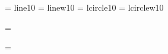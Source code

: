 \font\tenln    = line10
\font\tenlnw   = linew10  
\font\tencirc  = lcircle10 %
\font\tencircw = lcirclew10 %

%
\ifnum{}\tenln=\tencirc \else 
  \immediate{}\fi
\ifnum{}\tenlnw=\tencircw \else 
  \immediate{}\fi


\def\cmfont@{\def\rm{\protect\prm}\def\sl{\protect\psl}%
\def\bf{\protect\pbf\protect\pgt}}\cmfont@
\def\cmfont{\cmfont@\rm}%
\def\mcfont{\def\rm{\protect\pbk}\def\sl{\protect\psbk}%
\def\bf{\protect\pbbk\protect\pgt}\rm}%
\def\it{\protect\pit}
\def\sf{\protect\psf}
\def\sc{\protect\psc}
\def\tt{\protect\ptt}
\def\mc{\protect\pmin}
\def\gt{\protect\pgt}
\def\bk{\protect\pbk}
\def\mbk{\protect\pmbk}
\def\bbk{\protect\pbbk}
\def\ebk{\protect\pebk}
\def\sbk{\protect\psbk}
\def\smbk{\protect\psmbk}
\def\sbbk{\protect\psbbk}
\def\sebk{\protect\psebk}
\def\elite{\protect\pel}
\def\belite{\protect\pbel}
\def\pica{\protect\ppi}
\def\bpica{\protect\pbpi}

\def\@mbi{cmmib10}
\def\@mbsy{cmbsy10}
\def\@mcsc{cmcsc10}
\def\@mss{cmss10}
\def\@lasyb{lasyb10}


\newfam\itfam      %
\newfam\slfam      %
\newfam\bffam      %
\newfam\ttfam      %
\newfam\sffam      %
\newfam\scfam      %
\newfam\lyfam      %
\newfam\mcfam      %
\newfam\gtfam      %
\newfam\chfam	   %

\def\cal{\fam\tw@}
\def\mit{\fam\@ne}

\def\@setstrut{\setbox\strutbox=\hbox{\vrule \@height .7\baselineskip
    \@depth .3\baselineskip \@width\z@}}


